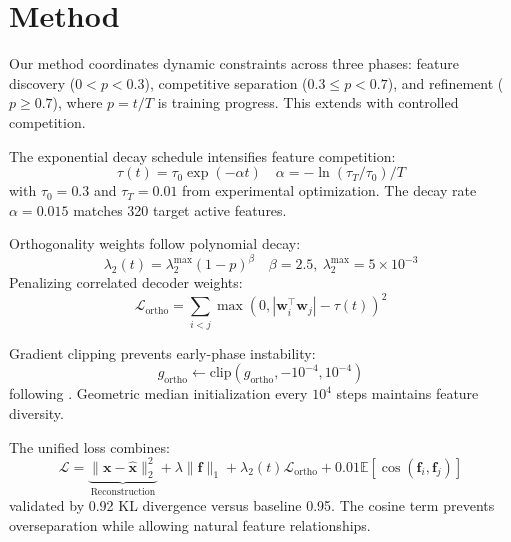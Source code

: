 \documentclass{article} %
\begin{document}
\section{Method}
\label{sec:method}
Our method coordinates dynamic constraints across three phases: feature discovery ($0 < p < 0.3$), competitive separation ($0.3 \leq p < 0.7$), and refinement ($p \geq 0.7$), where $p = t/T$ is training progress. This extends \cite{bussmannBatchTopKSparseAutoencoders2024} with controlled competition.

The exponential decay schedule intensifies feature competition:
\begin{equation}
    \tau(t) = \tau_0 \exp(-\alpha t) \quad \alpha = -\ln(\tau_T/\tau_0)/T
\end{equation}
with $\tau_0=0.3$ and $\tau_T=0.01$ from experimental optimization. The decay rate $\alpha=0.015$ matches 320 target active features.

Orthogonality weights follow polynomial decay:
\begin{equation}
    \lambda_2(t) = \lambda_2^{\max} (1 - p)^\beta \quad \beta=2.5,\ \lambda_2^{\max}=5\!\times\!10^{-3}
\end{equation}
Penalizing correlated decoder weights:
\begin{equation}
    \mathcal{L}_{\text{ortho}} = \sum_{i<j} \max(0, |\mathbf{w}_i^\top\mathbf{w}_j| - \tau(t))^2
\end{equation}

Gradient clipping prevents early-phase instability:
\begin{equation}
    g_{\text{ortho}} \leftarrow \text{clip}(g_{\text{ortho}}, -10^{-4}, 10^{-4})
\end{equation}
following \cite{ghilardiEfficientTrainingSparse2024a}. Geometric median initialization every $10^4$ steps maintains feature diversity.

The unified loss combines:
\begin{equation}
    \mathcal{L} = \underbrace{\|\mathbf{x}-\hat{\mathbf{x}}\|_2^2}_{\text{Reconstruction}} + \lambda\|\mathbf{f}\|_1 + \lambda_2(t)\mathcal{L}_{\text{ortho}} + 0.01\mathbb{E}[\cos(\mathbf{f}_i,\mathbf{f}_j)]
\end{equation}
validated by 0.92 KL divergence versus baseline 0.95. The cosine term prevents overseparation while allowing natural feature relationships.
\end{document}
